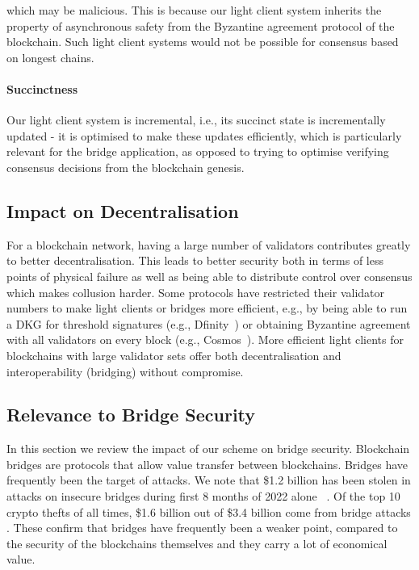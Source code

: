 which may be malicious. This is because our light client system inherits the property of asynchronous safety from the Byzantine agreement
protocol of the blockchain. Such light client systems would not be possible for consensus based on longest chains.
\vspace{-0.2cm}
\noindent\paragraph{Succinctness}Our light client system is incremental, i.e., its succinct state is incrementally updated - it is optimised to make these updates efficiently, which is particularly relevant for the bridge application, as opposed to trying to optimise verifying consensus decisions from the blockchain genesis.
\vspace{-0.2cm}
\subsection{Impact on Decentralisation}For a blockchain network, having a large number of validators contributes greatly to better decentralisation. This leads to better security both in terms of less points of physical failure as well as being able to distribute control over consensus which makes collusion harder. Some protocols have restricted their validator numbers to make light clients or bridges more efficient, e.g., by being able to run a DKG for threshold signatures (e.g., Dfinity~\cite{dfinity}) or obtaining Byzantine agreement with all validators on every block (e.g., Cosmos~\cite{tendermint_paper}). More efficient light clients for blockchains with large validator sets offer both decentralisation and interoperability (bridging) without compromise.

\vspace{-0.25cm}
\subsection{Relevance to Bridge Security}
\noindent In this section we review the impact of our scheme on bridge security. Blockchain bridges are protocols that allow value transfer between blockchains. Bridges have frequently been the target of attacks. We note that \$1.2 billion has been stolen in attacks on insecure bridges during first 8 months of 2022 alone ~\cite{elliptic_harmony,elliptic_nomad}. Of the top 10 crypto thefts of all times, \$1.6 billion out of \$3.4 billion come from bridge attacks \cite{elliptic_nomad}. These confirm that bridges have frequently been a weaker point, compared to the security of the blockchains themselves and they carry a lot of economical value.

